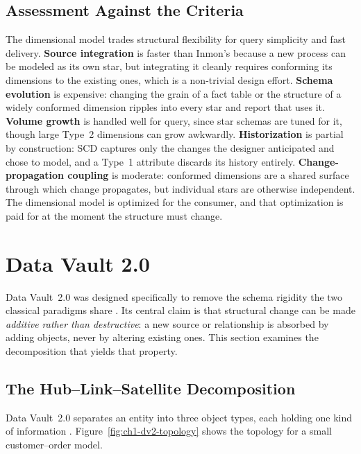 \subsection{Assessment Against the Criteria}
\label{subsec:ch1-kimball-assess}

The dimensional model trades structural flexibility for query simplicity and fast delivery. \textbf{Source integration} is faster than Inmon's because a new process can be modeled as its own star, but integrating it cleanly requires conforming its dimensions to the existing ones, which is a non-trivial design effort. \textbf{Schema evolution} is expensive: changing the grain of a fact table or the structure of a widely conformed dimension ripples into every star and report that uses it. \textbf{Volume growth} is handled well for query, since star schemas are tuned for it, though large Type~2 dimensions can grow awkwardly. \textbf{Historization} is partial by construction: SCD captures only the changes the designer anticipated and chose to model, and a Type~1 attribute discards its history entirely. \textbf{Change-propagation coupling} is moderate: conformed dimensions are a shared surface through which change propagates, but individual stars are otherwise independent. The dimensional model is optimized for the consumer, and that optimization is paid for at the moment the structure must change.

\section{Data Vault 2.0}
\label{sec:ch1-dv2}

Data Vault~2.0 was designed specifically to remove the schema rigidity the two classical paradigms share \parencite{linstedt2015}. Its central claim is that structural change can be made \textit{additive rather than destructive}: a new source or relationship is absorbed by adding objects, never by altering existing ones. This section examines the decomposition that yields that property.

\subsection{The Hub--Link--Satellite Decomposition}
\label{subsec:ch1-hls}

Data Vault~2.0 separates an entity into three object types, each holding one kind of information \parencite{linstedt2015}. Figure~\ref{fig:ch1-dv2-topology} shows the topology for a small customer--order model.

